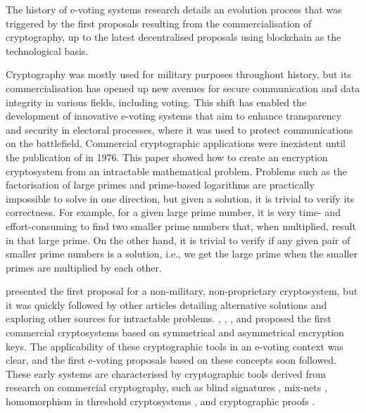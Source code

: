 \documentclass[../main.tex]{subfiles}
\begin{document}
The history of e-voting systems research details an evolution process that was triggered by the first proposals resulting from the commercialisation of cryptography, up to the latest decentralised proposals using blockchain as the technological basis.
\par
Cryptography was mostly used for military purposes throughout history, but its commercialisation has opened up new avenues for secure communication and data integrity in various fields, including voting. This shift has enabled the development of innovative e-voting systems that aim to enhance transparency and security in electoral processes, where it was used to protect communications on the battlefield. Commercial cryptographic applications were inexistent until the publication of \cite{Diffie1976} in 1976. This paper showed how to create an encryption cryptosystem from an intractable mathematical problem. Problems such as the factorisation of large primes and prime-based logarithms are practically impossible to solve in one direction, but given a solution, it is trivial to verify its correctness. For example, for a given large prime number, it is very time- and effort-consuming to find two smaller prime numbers that, when multiplied, result in that large prime. On the other hand, it is trivial to verify if any given pair of smaller prime numbers is a solution, i.e., we get the large prime when the smaller primes are multiplied by each other.
\par
\cite{Diffie1976} presented the first proposal for a non-military, non-proprietary cryptosystem, but it was quickly followed by other articles detailing alternative solutions and exploring other sources for intractable problems. \cite{Shamir1979}, \cite{Chaum1981}, \cite{ElGamal1984}, and \cite{Rivest1983} proposed the first commercial cryptosystems based on symmetrical and asymmetrical encryption keys. The applicability of these cryptographic tools in an e-voting context was clear, and the first e-voting proposals based on these concepts soon followed. These early systems are characterised by cryptographic tools derived from research on commercial cryptography, such as blind signatures \cite{Chaum1983}, mix-nets \cite{Chaum1988}, homomorphism in threshold cryptosystems \cite{Shamir1979}, and cryptographic proofs \cite{Goldwasser1986}.
\par
\end{document}
